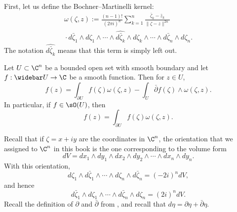 
First, let us define the Bochner--Martinelli kernel:
\begin{multline*}
\omega(\zeta,z):=\frac{(n-1)!}{(2\pi i)^n}\sum_{k=1}^n\frac{\bar\zeta_k-\bar z_k}{\|\zeta-z\|^{2n}}\\
{}\cdot d\bar\zeta_1\wedge d\zeta_1\wedge\cdots\wedge\widehat{d\bar\zeta_k}\wedge d\zeta_k\wedge\cdots\wedge d\bar\zeta_n\wedge d\zeta_n.
\end{multline*}
The notation $\widehat{d\bar\zeta_k}$ means that this term is simply left out.
\begin{thm}
Let $U\subset\C^n$ be a bounded open set with smooth boundary and let $f:\widebar U\to\C$ be a smooth function. Then for $z\in U$,
\[f(z)=\int_{\partial U}f(\zeta)\omega(\zeta,z)-\int_U\bar\partial f(\zeta)\wedge\omega(\zeta,z).\]
In particular, if $f\in\sO(U)$, then
\[f(z)=\int_{\partial U}f(\zeta)\omega(\zeta,z).\]
\end{thm}
Recall that if $\zeta=x+iy$ are the coordinates in $\C^n$, the orientation that we assigned to $\C^n$ in this book is the one corresponding to the volume form
\[dV=dx_1\wedge dy_1\wedge dx_2\wedge dy_2\wedge\cdots\wedge dx_n\wedge dy_n.\]
With this orientation,
\[d\zeta_1\wedge d\bar\zeta_1\wedge\cdots\wedge d\zeta_n\wedge d\bar\zeta_n=(-2i)^n dV,\]
and hence
\[d\bar\zeta_1\wedge d\zeta_1\wedge\cdots\wedge d\bar\zeta_n\wedge d\zeta_n=(2i)^n dV.\]
Recall the definition of $\partial$ and $\bar\partial$ from , and recall that $d\eta=\partial\eta+\bar\partial\eta$.
